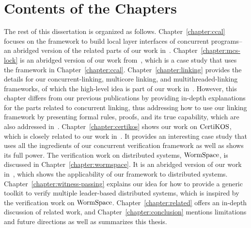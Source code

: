 \section{Contents of the Chapters}
\label{chapter:introduction:sec:contents-of-the-chapters}

The rest of this dissertation is organized as follows. Chapter~\ref{chapter:ccal} focuses on the framework to build local layer 
interfaces of concurrent programs--an abridged version of the related parts of our work in~\cite{concurrency}.
Chapter~\ref{chapter:mcs-lock} is an abridged version of our work from~\cite{mcslock},
which is a case study that uses the framework in Chapter~\ref{chapter:ccal}. 
Chapter~\ref{chapter:linking} provides the details for our concurrent-linking, multicore linking, and multithreaded-linking frameworks, 
of which the high-level idea is part of our work in~\cite{concurrency}.
However, this chapter differs from our previous publications by providing in-depth explanations for the parts related to concurrent linking, 
thus addressing how to use our linking framework by presenting formal rules, proofs, and its true capability, 
which are also addressed in~\cite{concurrency}.
Chapter~\ref{chapter:certikos} shows our work on $\mathrm{CertiKOS}$,
which is closely related to our work in~\cite{certikos:osdi16}. 
It provides an interesting case study that uses all the ingredients of our concurrent verification
 framework as well as shows its full power. The verification work on distributed systems, $\mathrm{WormSpace}$,
is discussed in Chapter~\ref{chapter:wormspace}.
It is an abridged version of our work in~\cite{wormspace},
which shows the applicability of our framework to distributed systems. 
Chapter~\ref{chapter:witness-passing} 
explains our idea for how to provide a generic toolkit to verify multiple leader-based distributed systems, 
which is inspired by the verification work on $\mathrm{WormSpace}$.
Chapter~\ref{chapter:related}
offers an in-depth discussion of related work, and  Chapter~\ref{chapter:conclusion}  
mentions limitations and future directions as well as summarizes this thesis.

